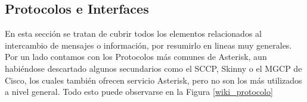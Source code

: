 
\subsection{Protocolos e Interfaces}

En esta sección se tratan de cubrir todos los elementos relacionados al intercambio de mensajes o información, por resumirlo en lineas muy generales. Por un lado contamos con los Protocolos más comunes de Asterisk, aun habiéndose descartado algunos secundarios como el SCCP, Skinny o el MGCP de Cisco, los cuales también ofrecen servicio Asterisk, pero no son los más utilizados a nivel general. Todo esto puede observarse en la Figura \ref{wiki_protocolo}


